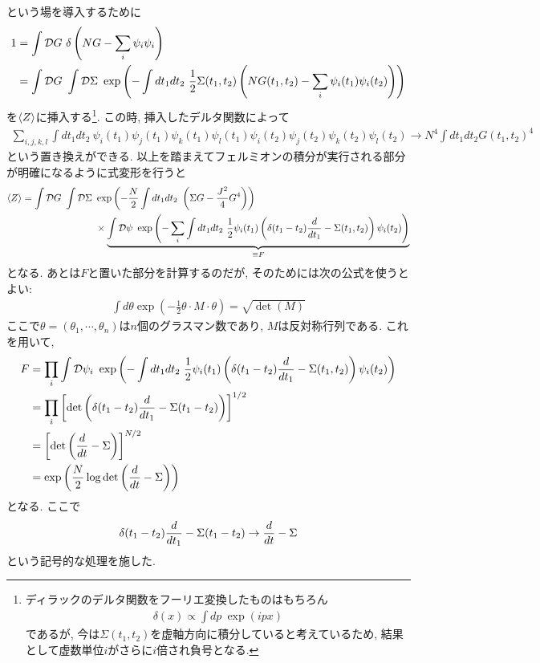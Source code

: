 	という場を導入するために
	\begin{align}
	1 &= \int \mathcal{D}G \ \delta\left(NG - \sum_i\psi_i\psi_i\right)\nonumber\\
	  &= \int \mathcal{D}G \ \int \mathcal{D}\Sigma \ \exp\left(
	  		-\int dt_1dt_2\ \frac{1}{2}\Sigma(t_1, t_2)\left(
	  		NG(t_1, t_2) - \sum_i\psi_i(t_1)\psi_i(t_2)\right)
	  	\right)
	\end{align}
	を$\langle Z \rangle$に挿入する\footnote{ディラックのデルタ関数をフーリエ変換したものはもちろん
	\begin{align}
	\delta(x) \propto \int dp\ \exp(ipx)\nonumber
	\end{align}であるが, 今は$\Sigma(t_1, t_2)$を虚軸方向に積分していると考えているため, 
	結果として虚数単位$i$がさらに$i$倍され負号となる. }. 
	この時, 挿入したデルタ関数によって
	\begin{align}
	\sum_{i,j,k,l}\int dt_1dt_2\
	\psi_i(t_1)\psi_j(t_1)\psi_k(t_1)\psi_l(t_1)
	\psi_i(t_2)\psi_j(t_2)\psi_k(t_2)\psi_l(t_2)
	\to N^4\int dt_1 dt_2 G(t_1, t_2)^4
	\end{align}
	という置き換えができる. 
	以上を踏まえてフェルミオンの積分が実行される部分が明確になるように式変形を行うと
	\begin{align}
	\langle Z \rangle = \int \mathcal{D}G \ \int \mathcal{D}\Sigma \ &\exp\left(
	-\frac{N}{2}\int dt_1dt_2\ \left(\Sigma G - \frac{J^2}{4}G^4\right)
	\right)\nonumber\\
	&\times\underbrace{\int \mathcal{D}\psi \ \exp\left(
	-\sum_i\int dt_1dt_2\ \frac{1}{2}\psi_i(t_1)\left(
	\delta(t_1 - t_2)\frac{d}{dt_1} - \Sigma(t_1, t_2)
	\right)\psi_i(t_2)
	\right)}_{\equiv F}
	\end{align}
	となる. 
	あとは$F$と置いた部分を計算するのだが, そのためには次の公式を使うとよい\cite{haber}:
	\begin{align}
	\int d\theta \exp\left(-\frac{1}{2}\theta\cdot M\cdot\theta\right) = \sqrt{\det(M)}
	\end{align}
	ここで$\theta = (\theta_1, \cdots, \theta_n)$は$n$個のグラスマン数であり, $M$は反対称行列である. 
	これを用いて, 
	\begin{align}
	F &= \prod_i \int \mathcal{D}\psi_i \  \exp\left(
	-\int dt_1dt_2\ \frac{1}{2}\psi_i(t_1)\left(
	\delta(t_1 - t_2)\frac{d}{dt_1} - \Sigma(t_1, t_2)
	\right)\psi_i(t_2)\right)\nonumber\\
	&= \prod_i \left[
	\det\left(\delta(t_1 - t_2)\frac{d}{dt_1} - \Sigma(t_1 - t_2)\right)
	\right]^{1/2}\nonumber\\
	&= \left[\det\left(\frac{d}{dt} - \Sigma\right)\right]^{N/2}\nonumber\\
	&= \exp\left(\frac{N}{2}\log\det\left(\frac{d}{dt} - \Sigma\right)\right)
	\end{align}
	となる. ここで
	\begin{align}
	\delta(t_1 - t_2)\frac{d}{dt_1} - \Sigma(t_1 - t_2) \to \frac{d}{dt} - \Sigma
	\end{align}
	という記号的な処理を施した. 

